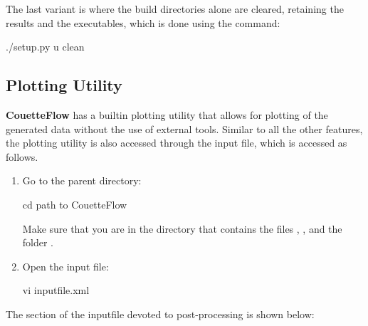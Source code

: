\documentclass[letterpaper,10pt,english]{sphinxmanual}
\begin{document}
The last variant is where the build directories alone are cleared, retaining the results and the executables, which is done using the command:

\begin{sphinxVerbatim}[commandchars=\\\{\}]
\PYGZdl{} ./setup.py \PYGZhy{}u clean
\end{sphinxVerbatim}


\subsection{Plotting Utility}
\label{\detokenize{couettepyfiles/plot:plot}}\label{\detokenize{couettepyfiles/plot::doc}}\label{\detokenize{couettepyfiles/plot:plotting-utility}}
{\color{red}\bfseries{}\textbar{}CouetteFlow\textbar{}} has a builtin plotting utility that allows for plotting of the generated data without the use of external tools. Similar to all the other features, the plotting utility is also accessed through the input file, which is accessed as follows.
\begin{enumerate}
\item {} 
Go to the parent directory:

\begin{sphinxVerbatim}[commandchars=\\\{\}]
\PYGZdl{} cd \PYGZlt{}path to \textbar{}CouetteFlow\textbar{}\PYGZgt{}
\end{sphinxVerbatim}

Make sure that you are in the directory that contains the files , , and the folder .

\item {} 
Open the input file:

\begin{sphinxVerbatim}[commandchars=\\\{\}]
\PYGZdl{} vi input\PYGZus{}file.xml
\end{sphinxVerbatim}

\end{enumerate}

The section of the inputfile devoted to post-processing is shown below:
\end{document}
